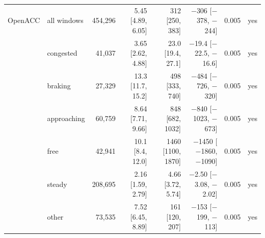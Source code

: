 \begin{longtable}{llrrrrrl}
\midrule
OpenACC & all windows & 454,296 & 5.45 [4.89, 6.05] & 312 [250, 383] & $-$306 [$-$378, $-$244] & 0.005 & yes \\
 & congested & 41,037 & 3.65 [2.62, 4.88] & 23.0 [19.4, 27.1] & $-$19.4 [$-$22.5, $-$16.6] & 0.005 & yes \\
 & braking & 27,329 & 13.3 [11.7, 15.2] & 498 [333, 740] & $-$484 [$-$726, $-$320] & 0.005 & yes \\
 & approaching & 60,759 & 8.64 [7.71, 9.66] & 848 [682, 1032] & $-$840 [$-$1023, $-$673] & 0.005 & yes \\
 & free & 42,941 & 10.1 [8.4, 12.0] & 1460 [1100, 1870] & $-$1450 [$-$1860, $-$1090] & 0.005 & yes \\
 & steady & 208,695 & 2.16 [1.59, 2.79] & 4.66 [3.72, 5.74] & $-$2.50 [$-$3.08, $-$2.02] & 0.005 & yes \\
 & other & 73,535 & 7.52 [6.45, 8.89] & 161 [120, 207] & $-$153 [$-$199, $-$113] & 0.005 & yes \\
\end{longtable}
\endgroup
